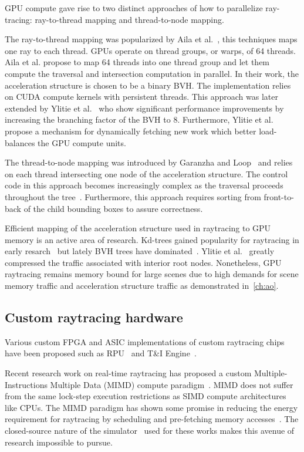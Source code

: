 GPU compute gave rise to two distinct approaches of how to parallelize ray-tracing: ray-to-thread mapping and thread-to-node mapping.

The ray-to-thread mapping was popularized by Aila et al.~\cite{10.5555/1921479.1921497, 10.1145/1572769.1572792}, this techniques maps one ray to each thread. GPUs operate on thread groups, or warps, of 64 threads. Aila et al. propose to map 64 threads into one thread group and let them compute the traversal and intersection computation in parallel. In their work, the acceleration structure is chosen to be a binary BVH. The implementation relies on CUDA compute kernels with persistent threads. 
This approach was later extended by Ylitie et al.~\cite{10.1145/3105762.3105773} who show significant performance improvements by increasing the branching factor of the BVH to 8. Furthermore, Ylitie et al. propose a mechanism for dynamically fetching new work which better load-balances the GPU compute units.

The thread-to-node mapping was introduced by Garanzha and Loop~\cite{article_Garanzha} and relies on each thread intersecting one node of the acceleration structure. The control code in this approach becomes increasingly complex as the traversal proceeds throughout the tree~\cite{10.1145/3105762.3105773}. Furthermore, this approach requires sorting from front-to-back of the child bounding boxes to assure correctness.

Efficient mapping of the acceleration structure used in raytracing to GPU memory is an active area of research. Kd-trees gained popularity for raytracing in early resarch~\cite{10.1145/1071866.1071869} but lately BVH trees have dominated~\cite{Aila:2009:UER:1572769.1572792}. Ylitie et al.~\cite{10.1145/3105762.3105773} greatly compressed the traffic associated with interior root nodes. Nonetheless, GPU raytracing remains memory bound for large scenes due to high demands for scene memory traffic and acceleration structure traffic as demonstrated in~\autoref{ch:ao}.

\subsection{Custom raytracing hardware}
Various custom FPGA and ASIC implementations of custom raytracing chips have been proposed such as RPU~\cite{article_woop_rpu} and T\&I Engine~\cite{10.1145/2070781.2024194}. 

Recent research work on real-time raytracing has proposed a custom Multiple-Instructions Multiple Data (MIMD) compute paradigm~\cite{Kopta-ICCD10}. MIMD does not suffer from the same lock-step execution restrictions as SIMD compute architectures like CPUs.
The MIMD paradigm has shown some promise in reducing the energy requirement for raytracing by scheduling and pre-fetching memory accesses~\cite{Spjut-SHAW12, Shkurko:2017:DSH:3105762.3105771, Vasiou2019}. The closed-source nature of the simulator~\cite{Shkurko:2017:DSH:3105762.3105771} used for these works makes this avenue of research impossible to pursue. 

